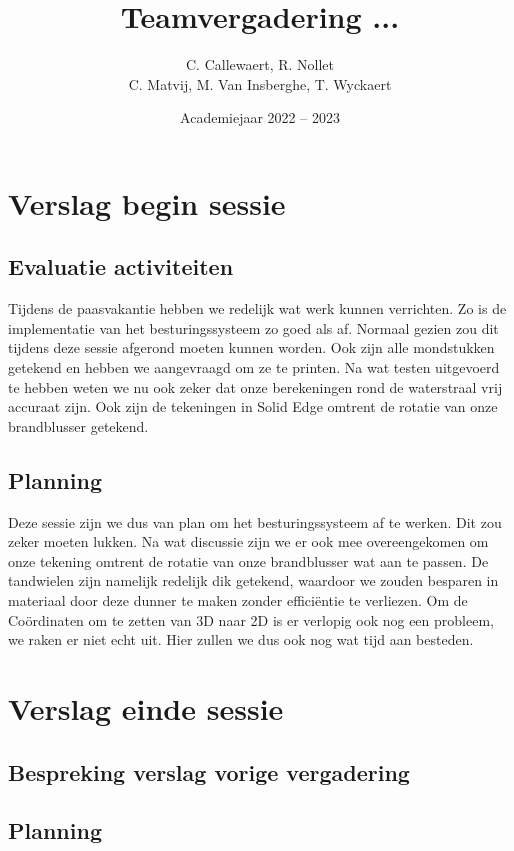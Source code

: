 \documentclass{kulakarticle}
\title{Teamvergadering ...}
\author{C. Callewaert, R. Nollet \\
	C. Matvij, M. Van Insberghe, T. Wyckaert }
\date{Academiejaar 2022 -- 2023}
\begin{document}
	\maketitle
\section{Verslag begin sessie}

	\subsection{Evaluatie activiteiten}
	
	Tijdens de paasvakantie hebben we redelijk wat werk kunnen verrichten. Zo is de implementatie van het besturingssysteem zo goed als af. Normaal gezien zou dit tijdens deze sessie afgerond moeten kunnen worden. Ook zijn alle mondstukken getekend en hebben we aangevraagd om ze te printen. Na wat testen uitgevoerd te hebben weten we nu ook zeker dat onze berekeningen rond de waterstraal vrij accuraat zijn. Ook zijn de tekeningen in Solid Edge omtrent de rotatie van onze brandblusser getekend. 
	
	\subsection{Planning}
	Deze sessie zijn we dus van plan om het besturingssysteem af te werken. Dit zou zeker moeten lukken. 
	Na wat discussie zijn we er ook mee overeengekomen om onze tekening omtrent de rotatie van onze brandblusser wat aan te passen. De tandwielen zijn namelijk redelijk dik getekend, waardoor we zouden besparen in  materiaal door deze dunner te maken zonder efficiëntie te verliezen. Om de Coördinaten om te zetten van 3D naar 2D is er verlopig ook nog een probleem, we raken er niet echt uit. Hier zullen we dus ook nog wat tijd aan besteden.
\section{Verslag einde sessie}

	\subsection{Bespreking verslag vorige vergadering}
	
	
	\subsection{Planning}

	
\end{document}
